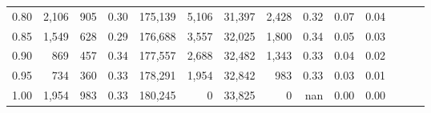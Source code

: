 \begin{tabular}{rrrrrrrrrrrrrr}
0.80 &   2,106 &    905 &  0.30 &  175,139 &    5,106 &  31,397 &   2,428 &  0.32 &  0.07 &      0.04 \\
0.85 &   1,549 &    628 &  0.29 &  176,688 &    3,557 &  32,025 &   1,800 &  0.34 &  0.05 &      0.03 \\
0.90 &     869 &    457 &  0.34 &  177,557 &    2,688 &  32,482 &   1,343 &  0.33 &  0.04 &      0.02 \\
0.95 &     734 &    360 &  0.33 &  178,291 &    1,954 &  32,842 &     983 &  0.33 &  0.03 &      0.01 \\
1.00 &   1,954 &    983 &  0.33 &  180,245 &        0 &  33,825 &       0 &   nan &  0.00 &      0.00 \\
\bottomrule
\end{tabular}
